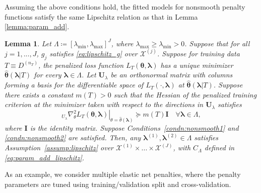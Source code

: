 \documentclass[12pt]{article} %
\newtheorem{lemma}{Lemma}
\theoremstyle{definition}
\begin{document}
Assuming the above conditions hold, the fitted models for nonsmooth penalty functions satisfy the same Lipschitz relation as that in Lemma \ref{lemma:param_add}.

\begin{lemma}
	\label{lemma:nonsmooth}
	Let $\Lambda \coloneqq \left [ \lambda_{\min}, \lambda_{\max} \right ]^J$, where $\lambda_{\max} \ge \lambda_{\min} > 0$.
	Suppose that for all $j = 1,...,J$, $g_j$ satisfies \eqref{eq:lipschitz_g} over $\mathcal{X}^{(j)}$.
	Suppose for training data $T\equiv D^{(n_{T})}$, the penalized loss function $L_{T}\left(\boldsymbol{\theta},\boldsymbol{\lambda}\right)$
	has a unique minimizer $\hat{\boldsymbol{\theta}}(\boldsymbol{\lambda}|T)$
	for every $\boldsymbol{\lambda}\in\Lambda$.
	Let $\boldsymbol{U}_{\lambda}$
	be an orthonormal matrix with columns forming a basis for the differentiable
	space of $L_{T}(\cdot,\boldsymbol{\lambda})$ at $\hat{\boldsymbol{\theta}}(\boldsymbol{\lambda}|T)$.
	Suppose there exists a constant $m(T)>0$ such that the Hessian of
	the penalized training criterion at the minimizer taken with respect
	to the directions in $\boldsymbol{U}_{\lambda}$ satisfies
	\begin{equation}
	\left._{U_{\lambda}}\nabla_{\theta}^{2}L_{T}(\boldsymbol{\theta},\boldsymbol{\lambda})\right|_{\theta=\hat{\theta}(\boldsymbol{\lambda})}\succeq m(T)\boldsymbol{I}\quad\forall\boldsymbol{\lambda}\in\Lambda,
	\end{equation}
	where \textup{$\boldsymbol{I}$ is the identity matrix.}
	Suppose Conditions~\ref{condn:nonsmooth1} and \ref{condn:nonsmooth2} are satisfied.
	Then, any $\boldsymbol{\lambda}^{(1)}, \boldsymbol{\lambda}^{(2)} \in \Lambda$ satisfies Assumption~\ref{assump:lipschitz} over $\mathcal{X}^{(1)} \times ... \times \mathcal{X}^{(J)}$, with $C_\Lambda$ defined in \eqref{eq:param_add_lipschitz}.
\end{lemma}

\noindent As an example, we consider multiple elastic net penalties, where the penalty parameters are tuned using training/validation split and cross-validation.
\end{document}

